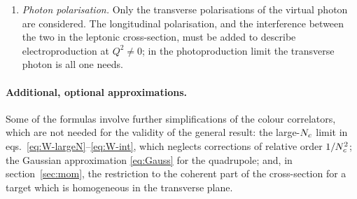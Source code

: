 \begin{enumerate}
apply a jet definition and for hadrons one must convolute with fragmentation functions. The partonic
cross-section is singular for $\xi\to0$ (soft gluon) and, for massless quarks, when the gluon is
collinear to its emitter; with massive quarks the collinear singularity is replaced by logarithms of
$k_\perp^2/\mf^2$ (section~\ref{sec:coll}).
\item \emph{Photon polarisation.} Only the transverse polarisations of the virtual photon are
considered. The longitudinal polarisation, and the interference between the two in the leptonic
cross-section, must be added to describe electroproduction at $Q^2\neq0$; in the photoproduction limit
the transverse photon is all one needs.
\end{enumerate}

\paragraph{Additional, optional approximations.} Some of the formulas involve further simplifications
of the colour correlators, which are not needed for the validity of the general result: the large-$N_c$
limit in eqs.~\eqref{eq:W-largeN}--\eqref{eq:W-int}, which neglects corrections of relative order
$1/N_c^2$; the Gaussian approximation \eqref{eq:Gauss} for the quadrupole; and, in
section~\ref{sec:mom}, the restriction to the coherent part of the cross-section for a target which is
homogeneous in the transverse plane.

